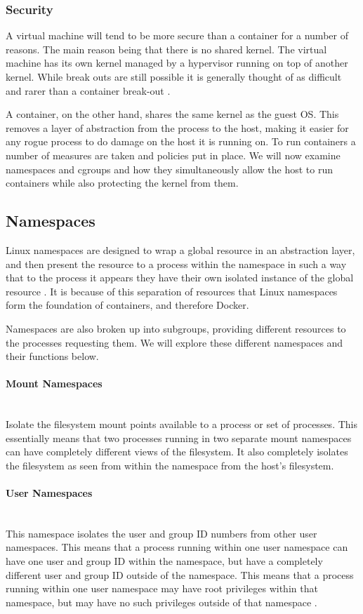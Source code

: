 \documentclass{article}
\begin{document}
\subsubsection{Security}

A virtual machine will tend to be more secure than a container for a number of reasons. The main reason being that there is no shared kernel. The virtual machine has its own kernel managed by a hypervisor running on top of another kernel. While break outs are still possible it is generally thought of as difficult and rarer than a container break-out \citep{Whitepaper2016}.

A container, on the other hand, shares the same kernel as the guest OS. This removes a layer of abstraction from the process to the host, making it easier for any rogue process to do damage on the host it is running on. To run containers a number of measures are taken and policies put in place. We will now examine namespaces and cgroups and how they simultaneously allow the host to run containers while also protecting the kernel from them.


\subsection{Namespaces}
\label{subs:Namespaces}
Linux namespaces are designed to wrap a global resource in an abstraction layer, and then present the resource to a process within the namespace in such a way that to the process it appears they have their own isolated instance of the global resource \citep{Kerrisk2013}. It is because of this separation of resources that Linux namespaces form the foundation of containers, and therefore Docker.

Namespaces are also broken up into subgroups, providing different resources to the processes requesting them. We will explore these different namespaces and their functions below.


\paragraph{Mount Namespaces}\mbox{}\\
Isolate the filesystem mount points available to a process or set of processes. This essentially means that two processes running in two separate mount namespaces can have completely different views of the filesystem. It also completely isolates the filesystem as seen from within the namespace from the host's filesystem.

\paragraph{User Namespaces}\mbox{}\\
This namespace isolates the user and group ID numbers from other user namespaces. This means that a process running within one user namespace can have one user and group ID within the namespace, but have a completely different user and group ID outside of the namespace. This means that a process running within one user namespace may have root privileges within that namespace, but may have no such privileges outside of that namespace \citep{Kerrisk2013}.
\end{document}

